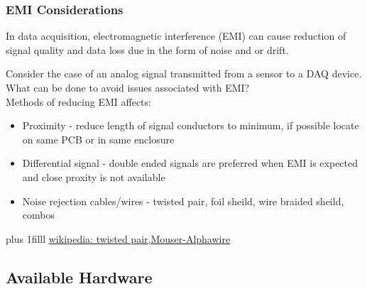 \documentclass[fleqn]{beamer} %
\newcommand{\sectionIIsubsectionIItitle}{EMI Considerations}
\newcommand{\sectionIIsubsectionIIItitle}{Available Hardware}
\newcommand{\btVFill}{\vskip0pt plus 1filll}
\begin{document}
			\begin{frame}
				\frametitle{\sectionIIsubsectionIItitle} \scriptsize
	
				\bigskip

				In data acquisition, electromagnetic interference (EMI) can cause reduction of signal quality and data loss due in the form of {\BR noise} and or {\GR drift}. \vspace{10mm}

				Consider the case of an analog signal transmitted from a sensor to a DAQ device. What can be done to avoid issues associated with EMI?  \vspace{5mm}\\

				Methods of reducing EMI affects:
				\begin{itemize}
					\item Proximity - reduce length of signal conductors to minimum, if possible locate on same PCB or in same enclosure

					\item Differential signal - double ended signals are preferred when EMI is expected and close proxity is not available 

					\item Noise rejection cables/wires - twisted pair, foil sheild, wire braided sheild, combos 

				\end{itemize}


				\btVFill
				\tiny{\href{https://en.wikipedia.org/wiki/Twisted_pair}{wikipedia: twisted pair,}\href{https://www.mouser.com/pdfdocs/alphawire-Understanding-Shielded-Cable.pdf}{Mouser-Alphawire}}		
			\end{frame}

		\subsection{\sectionIIsubsectionIIItitle}\label{sectionIIsubsectionIII}
\end{document}
